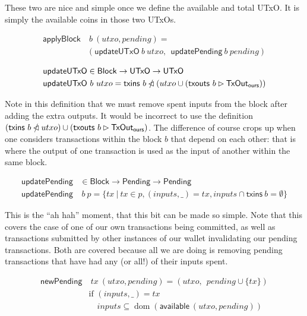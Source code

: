 \documentclass{article}
\DeclareMathOperator{\dom}{dom}
\newcommand{\restrictdom}{\lhd}
\newcommand{\subtractdom}{\mathbin{\slashed{\restrictdom}}}
\newcommand{\restrictrange}{\rhd}
\begin{document}
These two are nice and simple once we define the available and total UTxO. It
is simply the available coins in those two UTxOs.

\begin{equation} \label{applyBlock_spec}
\begin{split}
\mathsf{applyBlock} & ~ b ~ (utxo, pending) = \\
                    & (\mathsf{updateUTxO} ~ b ~ utxo, ~~ \mathsf{updatePending} ~ b ~ pending)
\end{split}
\end{equation}

\begin{equation}
\begin{split}
\mathsf{updateUTxO} & \in \mathsf{Block} \to \mathsf{UTxO} \to \mathsf{UTxO} \\
\mathsf{updateUTxO} & ~ b ~ utxo = \mathsf{txins} ~ b \subtractdom (utxo \cup (\mathsf{txouts} ~ b \restrictrange \mathsf{TxOut_{ours}}))
\end{split}
\end{equation}

Note in this definition that we must remove spent inputs from the block after
adding the extra outputs. It would be incorrect to use the definition $(\mathsf{txins} ~ b \subtractdom utxo)  \cup (\mathsf{txouts} ~ b \restrictrange \mathsf{TxOut_{ours}})$.
The difference of course crops up when one considers transactions within the
block $b$ that depend on each other: that is where the output of one transaction
is used as the input of another within the same block.

\begin{equation}
\begin{split}
\mathsf{updatePending} & \in \mathsf{Block} \to \mathsf{Pending} \to \mathsf{Pending} \\
\mathsf{updatePending} & ~ b ~ p = \{ tx ~|~ tx \in p, (inputs, \_) = tx, inputs \cap \mathsf{txins} ~ b = \emptyset \}
\end{split}
\end{equation}

This is the ``ah hah'' moment, that this bit can be made so simple. Note that
this covers the case of one of our own transactions being committed, as well as
transactions submitted by other instances of our wallet invalidating our
pending transactions. Both are covered because all we are doing is removing
pending transactions that have had any (or all!) of their inputs spent.

\begin{equation}
\begin{split}
\mathsf{newPending} & ~ tx ~ (utxo, pending) = ( utxo, ~~ pending \cup \{ tx \} ) \\
                    & \text{if } (inputs, \_) = tx \\
                    & \quad inputs \subseteq \dom (\mathsf{available} ~ (utxo, pending))
\end{split}
\end{equation}
\end{document}
